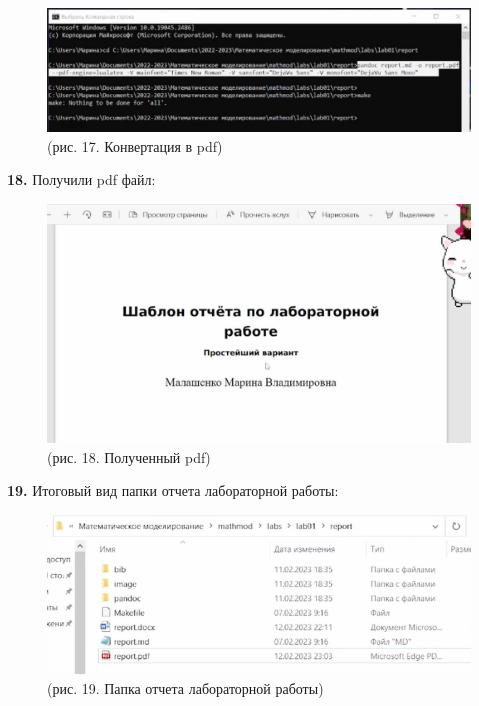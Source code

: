 \documentclass[
  12pt,
  a4paper,
]{scrreprt}
\begin{document}
\begin{figure}
\centering
\includegraphics{./tex2pdf.-cbf55669a78d292a/image/17.PNG}
\caption{(рис. 17. Конвертация в pdf)}
\end{figure}

\textbf{18.} Получили pdf файл:

\begin{figure}
\centering
\includegraphics{./tex2pdf.-cbf55669a78d292a/image/18.PNG}
\caption{(рис. 18. Полученный pdf)}
\end{figure}

\textbf{19.} Итоговый вид папки отчета лабораторной работы:

\begin{figure}
\centering
\includegraphics{./tex2pdf.-cbf55669a78d292a/image/19.PNG}
\caption{(рис. 19. Папка отчета лабораторной работы)}
\end{figure}
\end{document}
